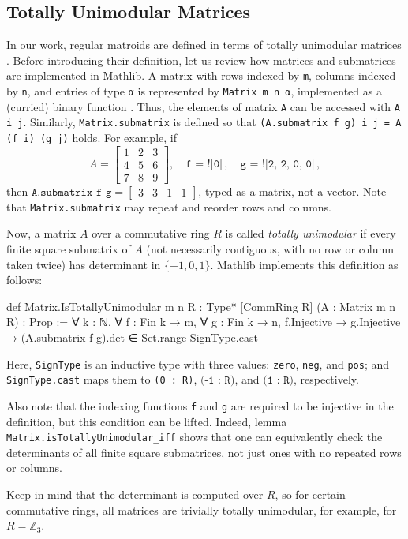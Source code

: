 \subsection{Totally Unimodular Matrices}

In our work, regular matroids are defined in terms of totally unimodular matrices \cite{Oxley2011,Truemper2016}. Before introducing their definition, let us review how matrices and submatrices are implemented in Mathlib. A matrix with rows indexed by \texttt{m}, columns indexed by \texttt{n}, and entries of type \texttt{α} is represented by \texttt{Matrix m n α}, implemented as a (curried) binary function . Thus, the elements of matrix \texttt{A} can be accessed with \texttt{A i j}. Similarly, \texttt{Matrix.submatrix} is defined so that \texttt{(A.submatrix f g) i j = A (f i) (g j)} holds. For example, if
\[
    A = \begin{bmatrix}
       1 & 2 & 3 \\
       4 & 5 & 6 \\
       7 & 8 & 9
    \end{bmatrix},
    \quad
    \texttt{f = ![0]}\,,
    \quad
    \texttt{g = ![2, 2, 0, 0]}\,,
\]
then
$
    \texttt{A.submatrix f g} =
    \begin{bmatrix}
       3 & 3 & 1 & 1
    \end{bmatrix}
$, typed as a matrix, not a vector. Note that \texttt{Matrix.submatrix} may repeat and reorder rows and columns.

Now, a matrix $A$ over a commutative ring $R$ is called \emph{totally unimodular} if every finite square submatrix of $A$ (not necessarily contiguous, with no row or column taken twice) has determinant in $\{-1, 0, 1\}$. Mathlib implements this definition as follows:
\begin{leancode}
def Matrix.IsTotallyUnimodular {m n R : Type*}
    [CommRing R] (A : Matrix m n R) :
    Prop :=
  ∀ k : ℕ, ∀ f : Fin k → m, ∀ g : Fin k → n,
    f.Injective → g.Injective →
      (A.submatrix f g).det ∈
        Set.range SignType.cast
\end{leancode}
Here, \texttt{SignType} is an inductive type with three values: \texttt{zero}, \texttt{neg}, and \texttt{pos}; and \texttt{SignType.cast} maps them to \texttt{(0 : R)}, $\texttt{(-1 : R)}$, and $\texttt{(1 : R)}$, respectively.

Also note that the indexing functions \texttt{f} and \texttt{g} are required to be injective in the definition, but this condition can be lifted. Indeed, lemma \texttt{Matrix.isTotallyUnimodular\_iff} shows that one can equivalently check the determinants of all finite square submatrices, not just ones with no repeated rows or columns.

Keep in mind that the determinant is computed over $R$, so for certain commutative rings, all matrices are trivially totally unimodular, for example, for $R = \mathbb{Z}_{3}$.
